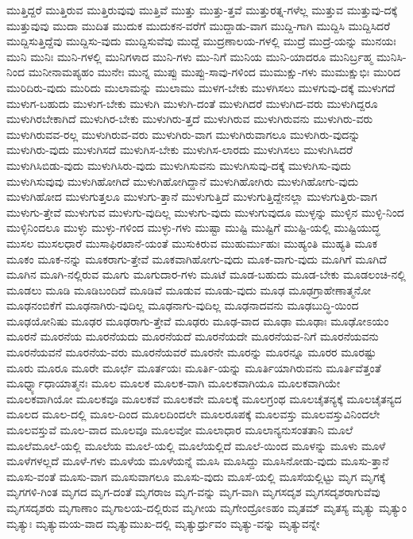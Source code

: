 {ಮುತ್ತಿದ್ದರೆ
ಮುತ್ತಿರುವ
ಮುತ್ತಿರುವುವು
ಮುತ್ತಿವೆ
ಮುತ್ತು
ಮುತ್ತು-ತ್ತವೆ
ಮುತ್ತುರತ್ನ-ಗಳೆಲ್ಲ
ಮುತ್ತುವ
ಮುತ್ತುವು-ದಕ್ಕೆ
ಮುತ್ತುವುವು
ಮುದಾ
ಮುದಿತ
ಮುದುಕ
ಮುದುಕನ-ವರೆಗೆ
ಮುದ್ದಾಡು-ವಾಗ
ಮುದ್ದಿ-ಗಾಗಿ
ಮುದ್ದಿಸಿ
ಮುದ್ದಿಸಿದರೆ
ಮುದ್ದಿಸುತ್ತಿದ್ದೆವು
ಮುದ್ದಿಸು-ವುದು
ಮುದ್ದಿಸುವೆವು
ಮುದ್ದೆ
ಮುದ್ರಣಾಲಯ-ಗಳಲ್ಲಿ
ಮುದ್ರೆ
ಮುದ್ರೆ-ಯನ್ನು
ಮುನಯಃ
ಮುನಿ
ಮುನಿಃ
ಮುನಿ-ಗಳಲ್ಲಿ
ಮುನಿಗಳಾದ
ಮುನಿ-ಗಳು
ಮು-ನಿಗೆ
ಮುನಿಯ
ಮುನಿ-ಯಾದರೂ
ಮುನಿರ್ಬ್ರಹ್ಮ
ಮುನಿಸಿ-ನಿಂದ
ಮುನೀನಾಮಪ್ಯಹಂ
ಮುನೇಃ
ಮುನ್ನ
ಮುಪ್ಪು
ಮುಪ್ಪು-ಸಾವು-ಗಳಿಂದ
ಮುಮುಕ್ಷು-ಗಳು
ಮುಮುಕ್ಷುಭಿಃ
ಮುರಿದ
ಮುರಿದಿರು-ವುದು
ಮುರಿದು
ಮುಲಾಮನ್ನು
ಮುಲಾಮು
ಮುಳಗ-ಬೇಕು
ಮುಳಗಿಸಲು
ಮುಳಗುವು-ದಕ್ಕೆ
ಮುಳುಗದೆ
ಮುಳುಗ-ಬಹುದು
ಮುಳುಗ-ಬೇಕು
ಮುಳುಗಿ
ಮುಳುಗಿ-ದಂತೆ
ಮುಳುಗಿದರೆ
ಮುಳುಗಿದ-ವರು
ಮುಳುಗಿದ್ದರೂ
ಮುಳುಗಿರಬೇಕಾಗಿದೆ
ಮುಳುಗಿರ-ಬೇಕು
ಮುಳುಗಿರು-ತ್ತದೆ
ಮುಳುಗಿರುವ
ಮುಳುಗಿರುವನು
ಮುಳುಗಿರು-ವರು
ಮುಳುಗಿರುವವ-ರಲ್ಲ
ಮುಳುಗಿರುವ-ವರು
ಮುಳುಗಿರು-ವಾಗ
ಮುಳುಗಿರುವಾಗಲೂ
ಮುಳುಗಿರು-ವುದನ್ನು
ಮುಳುಗಿರು-ವುದು
ಮುಳುಗಿಸದೆ
ಮುಳುಗಿಸ-ಬೇಕು
ಮುಳುಗಿಸ-ಲಾರದು
ಮುಳುಗಿಸಲು
ಮುಳುಗಿಸಿದರೆ
ಮುಳುಗಿಸಿಬಿಡು-ವುದು
ಮುಳುಗಿಸಿರು-ವುದು
ಮುಳುಗಿಸುವನು
ಮುಳುಗಿಸುವು-ದಕ್ಕೆ
ಮುಳುಗಿಸು-ವುದು
ಮುಳುಗಿಸುವುವು
ಮುಳುಗಿಹೋಗಿದೆ
ಮುಳುಗಿಹೋಗಿದ್ದಾನೆ
ಮುಳುಗಿಹೋಗಿರು
ಮುಳುಗಿಹೋಗು-ವುದು
ಮುಳುಗಿಹೋದ
ಮುಳುಗುತ್ತಲೂ
ಮುಳುಗು-ತ್ತಾನೆ
ಮುಳುಗುತ್ತಿದೆ
ಮುಳುಗುತ್ತಿದ್ದೇನಲ್ಲಾ
ಮುಳುಗುತ್ತಿರು-ವಾಗ
ಮುಳುಗು-ತ್ತೇವೆ
ಮುಳುಗುವ
ಮುಳುಗು-ವುದಿಲ್ಲ
ಮುಳುಗು-ವುದು
ಮುಳುಗುವುದೂ
ಮುಳ್ಳನ್ನು
ಮುಳ್ಳಿನ
ಮುಳ್ಳಿ-ನಿಂದ
ಮುಳ್ಳಿನಿಂದಲೂ
ಮುಳ್ಳು
ಮುಳ್ಳು-ಗಳಿಂದ
ಮುಳ್ಳು-ಗಳು
ಮುಷ್ಟಾ
ಮುಷ್ಟಿ
ಮುಷ್ಟಿಗೆ
ಮುಷ್ಟಿ-ಯಲ್ಲಿ
ಮುಷ್ಟಿಯುದ್ಧ
ಮುಸಲ
ಮುಸಲಧಾರೆ
ಮುಸಾಫಿರಖಾನೆ-ಯಂತೆ
ಮುಸುಕಿರುವ
ಮುಹುರ್ಮುಹುಃ
ಮುಹ್ಯಂತಿ
ಮುಹ್ಯತಿ
ಮೂಕ
ಮೂಕಂ
ಮೂಕ-ನನ್ನು
ಮೂಕರಾಗು-ತ್ತೇವೆ
ಮೂಕವಾಗಿಹೋಗು-ವುದು
ಮೂಕ-ವಾಗು-ವುದು
ಮೂಗಿಗೆ
ಮೂಗಿದೆ
ಮೂಗಿನ
ಮೂಗಿ-ನಲ್ಲಿರುವ
ಮೂಗು
ಮೂಗುದಾರ-ಗಳು
ಮೂಟೆ
ಮೂಡ-ಬಹುದು
ಮೂಡ-ಬೇಕು
ಮೂಡಲಂಚಿ-ನಲ್ಲಿ
ಮೂಡಲು
ಮೂಡಿ
ಮೂಡಿಬಂದಿದೆ
ಮೂಡಿವೆ
ಮೂಡುವ
ಮೂಡು-ವುದು
ಮೂಢ
ಮೂಢಗ್ರಾಹೇಣಾತ್ಮನೋ
ಮೂಢನಂಬಿಕೆಗೆ
ಮೂಢನಾಗಿರು-ವುದಿಲ್ಲ
ಮೂಢನಾಗು-ವುದಿಲ್ಲ
ಮೂಢನಾದವನು
ಮೂಢಬುದ್ಧಿ-ಯಿಂದ
ಮೂಢಯೋನಿಷು
ಮೂಢರ
ಮೂಢರಾಗು-ತ್ತೇವೆ
ಮೂಢರು
ಮೂಢ-ವಾದ
ಮೂಢಾ
ಮೂಢಾಃ
ಮೂಢೋಽಯಂ
ಮೂರನೆ
ಮೂರನೆಯ
ಮೂರನೆಯದು
ಮೂರನೆಯದೆ
ಮೂರನೆಯದೇ
ಮೂರನೆಯವ-ನಿಗೆ
ಮೂರನೆಯವನು
ಮೂರನೆಯವನೆ
ಮೂರನೆಯ-ವರು
ಮೂರನೆಯವರೆ
ಮೂರನೇ
ಮೂರನ್ನು
ಮೂರನ್ನೂ
ಮೂರರ
ಮೂರಷ್ಟು
ಮೂರು
ಮೂರೂ
ಮೂರೇ
ಮೂರ್ಛೆ
ಮೂರ್ತಯಃ
ಮೂರ್ತಿ-ಯನ್ನು
ಮೂರ್ತಿಯಾಗಿರುವನು
ಮೂರ್ತಿವೆತ್ತಂತೆ
ಮೂರ್ಧ್ನ್ಯಾಧಾಯಾತ್ಮನಃ
ಮೂಲ
ಮೂಲಕ
ಮೂಲಕ-ವಾಗಿ
ಮೂಲಕವಾಗಿಯೂ
ಮೂಲಕವಾಗಿಯೇ
ಮೂಲಕವಾಗಿಯೋ
ಮೂಲಕವೂ
ಮೂಲಕವೆ
ಮೂಲಕವೇ
ಮೂಲಕ್ಕೆ
ಮೂಲಗ್ರಂಥ
ಮೂಲಚೈತನ್ಯಕ್ಕೆ
ಮೂಲಚೈತನ್ಯದ
ಮೂಲದ
ಮೂಲ-ದಲ್ಲಿ
ಮೂಲ-ದಿಂದ
ಮೂಲದಿಂದಲೇ
ಮೂಲರೂಪಕ್ಕೆ
ಮೂಲವಸ್ತು
ಮೂಲವಸ್ತುವಿನಿಂದಲೇ
ಮೂಲವಸ್ತುವೆ
ಮೂಲ-ವಾದ
ಮೂಲವೂ
ಮೂಲವೋ
ಮೂಲಾಧಾರ
ಮೂಲಾನ್ಯನುಸಂತತಾನಿ
ಮೂಲೆ
ಮೂಲೆಮೂಲೆ-ಯಲ್ಲಿ
ಮೂಲೆಯ
ಮೂಲೆ-ಯಲ್ಲಿ
ಮೂಲೆಯಲ್ಲಿದೆ
ಮೂಲೆ-ಯಿಂದ
ಮೂಳನ್ನು
ಮೂಳು
ಮೂಳೆ
ಮೂಳೆಗಳಲ್ಲದೆ
ಮೂಳೆ-ಗಳು
ಮೂಳೆಯ
ಮೂಳೆಯನ್ನೆ
ಮೂಸಿ
ಮೂಸಿದ್ದು
ಮೂಸಿನೋಡು-ವುದು
ಮೂಸು-ತ್ತಾನೆ
ಮೂಸು-ವಂತೆ
ಮೂಸು-ವಾಗ
ಮೂಸುವಾಗಲೂ
ಮೂಸು-ವುದು
ಮೂಸೆ-ಯಲ್ಲಿ
ಮೂಸೆಯಲ್ಲಿಟ್ಟು
ಮೃಗ
ಮೃಗಕ್ಕೆ
ಮೃಗಗಳಿ-ಗಿಂತ
ಮೃಗದ
ಮೃಗ-ದಂತೆ
ಮೃಗರಾಜ
ಮೃಗ-ವನ್ನು
ಮೃಗ-ವಾಗಿ
ಮೃಗಸದೃಶ
ಮೃಗಸದೃಶರಾಗುವೆವು
ಮೃಗಸದೃಶರು
ಮೃಗಾಣಾಂ
ಮೃಗಾಲಯ-ದಲ್ಲಿರುವ
ಮೃಗೀಯ
ಮೃಗೇಂದ್ರೋಽಹಂ
ಮೃತಮ್
ಮೃತಸ್ಯ
ಮೃತ್ಯು
ಮೃತ್ಯುಂ
ಮೃತ್ಯುಃ
ಮೃತ್ಯುಮಯ-ವಾದ
ಮೃತ್ಯುಮುಖ-ದಲ್ಲಿ
ಮೃತ್ಯುರ್ಧ್ರುವಂ
ಮೃತ್ಯು-ವನ್ನು
ಮೃತ್ಯುವನ್ನೇ
}
